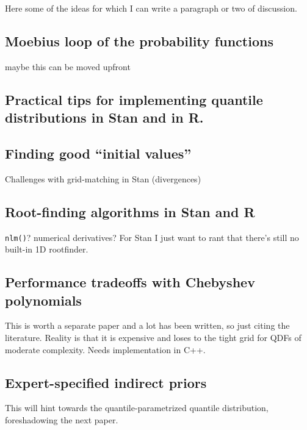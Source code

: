 \documentclass[
  12pt,
]{article}
\begin{document}
Here some of the ideas for which I can write a paragraph or two of discussion.

\hypertarget{moebius-loop-of-the-probability-functions}{%
\subsection{Moebius loop of the probability functions}\label{moebius-loop-of-the-probability-functions}}

maybe this can be moved upfront

\hypertarget{practical-tips-for-implementing-quantile-distributions-in-stan-and-in-r.}{%
\subsection{Practical tips for implementing quantile distributions in Stan and in R.}\label{practical-tips-for-implementing-quantile-distributions-in-stan-and-in-r.}}

\hypertarget{finding-good-initial-values}{%
\subsection{Finding good ``initial values''}\label{finding-good-initial-values}}

Challenges with grid-matching in Stan (divergences)

\hypertarget{root-finding-algorithms-in-stan-and-r}{%
\subsection{Root-finding algorithms in Stan and R}\label{root-finding-algorithms-in-stan-and-r}}

\texttt{nlm()}? numerical derivatives? For Stan I just want to rant that there's still no built-in 1D rootfinder.

\hypertarget{performance-tradeoffs-with-chebyshev-polynomials}{%
\subsection{Performance tradeoffs with Chebyshev polynomials}\label{performance-tradeoffs-with-chebyshev-polynomials}}

This is worth a separate paper and a lot has been written, so just citing the literature. Reality is that it is expensive and loses to the tight grid for QDFs of moderate complexity. Needs implementation in C++.

\hypertarget{expert-specified-indirect-priors}{%
\subsection{Expert-specified indirect priors}\label{expert-specified-indirect-priors}}

This will hint towards the quantile-parametrized quantile distribution, foreshadowing the next paper.

  
\end{document}
